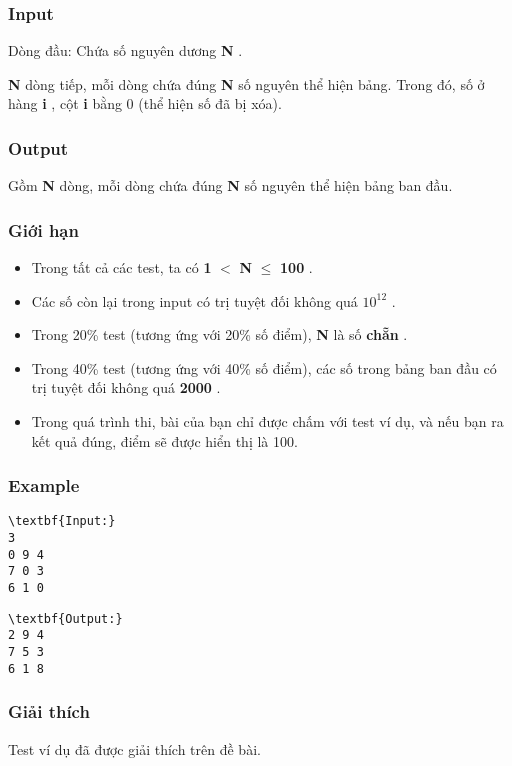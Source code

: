 \subsubsection{   Input  }

   Dòng đầu: Chứa số nguyên dương   \textbf{    N   }   .  

\textbf{    N   }   dòng tiếp, mỗi dòng chứa đúng   \textbf{    N   }   số nguyên thể hiện bảng. Trong đó, số ở hàng   \textbf{    i   }   , cột   \textbf{    i   }   bằng 0 (thể hiện số đã bị xóa).  

\subsubsection{   Output  }

   Gồm   \textbf{    N   }   dòng, mỗi dòng chứa đúng   \textbf{    N   }   số nguyên thể hiện bảng ban đầu.  

\subsubsection{   Giới hạn  }
\begin{itemize}
	\item     Trong tất cả các test, ta có    \textbf{     1    }    $<$    \textbf{     N    }     $\le$     \textbf{     100    }    .   
	\item     Các số còn lại trong input có trị tuyệt đối không quá    \textbf{     $10^{12}$}    .   
	\item     Trong 20\% test (tương ứng với 20\% số điểm),    \textbf{     N    }    là số    \textbf{     chẵn    }    .   
	\item     Trong 40\% test (tương ứng với 40\% số điểm), các số trong bảng ban đầu có trị tuyệt đối không quá    \textbf{     2000    }    .   
	\item     Trong quá trình thi, bài của bạn chỉ được chấm với test ví dụ, và nếu bạn ra kết quả đúng, điểm sẽ được hiển thị là 100.   
\end{itemize}

\subsubsection{   Example  }
\begin{verbatim}
\textbf{Input:}
3
0 9 4
7 0 3
6 1 0
\end{verbatim}
\begin{verbatim}
\textbf{Output:}
2 9 4
7 5 3
6 1 8
\end{verbatim}

\subsubsection{   Giải thích  }

   Test ví dụ đã được giải thích trên đề bài.  
